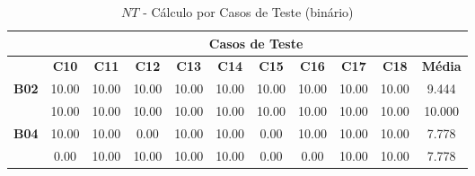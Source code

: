 \begin{table}[htbp]
	\centering
	\caption{$NT$ - Cálculo por Casos de Teste (binário)}
	\begin{tabular}{c|cccccccccc|}
		\cline{2-11}
		\rowcolor[HTML]{D0CECE} 
		\cellcolor[HTML]{F2F2F2}\textbf{} & \multicolumn{10}{c|}{\cellcolor[HTML]{D0CECE}\textbf{Casos de Teste}} \\ \hline
		\rowcolor[HTML]{D9D9D9} 
		\multicolumn{1}{|c|}{\cellcolor[HTML]{D0CECE}\textbf{Part.}} & \multicolumn{1}{c|}{\cellcolor[HTML]{D9D9D9}\textbf{C10}} & \multicolumn{1}{c|}{\cellcolor[HTML]{D9D9D9}\textbf{C11}} & \multicolumn{1}{c|}{\cellcolor[HTML]{D9D9D9}\textbf{C12}} & \multicolumn{1}{c|}{\cellcolor[HTML]{D9D9D9}\textbf{C13}} & \multicolumn{1}{c|}{\cellcolor[HTML]{D9D9D9}\textbf{C14}} & \multicolumn{1}{c|}{\cellcolor[HTML]{D9D9D9}\textbf{C15}} & \multicolumn{1}{c|}{\cellcolor[HTML]{D9D9D9}\textbf{C16}} & \multicolumn{1}{c|}{\cellcolor[HTML]{D9D9D9}\textbf{C17}} & \multicolumn{1}{c|}{\cellcolor[HTML]{D9D9D9}\textbf{C18}} & \textbf{Média} \\ \hline
		\multicolumn{1}{|c|}{\textbf{B02}} & \multicolumn{1}{c|}{10.00} & \multicolumn{1}{c|}{10.00} & \multicolumn{1}{c|}{10.00} & \multicolumn{1}{c|}{10.00} & \multicolumn{1}{c|}{10.00} & \multicolumn{1}{c|}{10.00} & \multicolumn{1}{c|}{10.00} & \multicolumn{1}{c|}{10.00} & \multicolumn{1}{c|}{10.00} & 9.444 \\ \hline
		\rowcolor[HTML]{F2F2F2} 
		\multicolumn{1}{|c|}{\cellcolor[HTML]{F2F2F2}\textbf{B03}} & \multicolumn{1}{c|}{\cellcolor[HTML]{F2F2F2}10.00} & \multicolumn{1}{c|}{\cellcolor[HTML]{F2F2F2}10.00} & \multicolumn{1}{c|}{\cellcolor[HTML]{F2F2F2}10.00} & \multicolumn{1}{c|}{\cellcolor[HTML]{F2F2F2}10.00} & \multicolumn{1}{c|}{\cellcolor[HTML]{F2F2F2}10.00} & \multicolumn{1}{c|}{\cellcolor[HTML]{F2F2F2}10.00} & \multicolumn{1}{c|}{\cellcolor[HTML]{F2F2F2}10.00} & \multicolumn{1}{c|}{\cellcolor[HTML]{F2F2F2}10.00} & \multicolumn{1}{c|}{\cellcolor[HTML]{F2F2F2}10.00} & 10.000 \\ \hline
		\multicolumn{1}{|c|}{\textbf{B04}} & \multicolumn{1}{c|}{10.00} & \multicolumn{1}{c|}{10.00} & \multicolumn{1}{c|}{0.00} & \multicolumn{1}{c|}{10.00} & \multicolumn{1}{c|}{10.00} & \multicolumn{1}{c|}{0.00} & \multicolumn{1}{c|}{10.00} & \multicolumn{1}{c|}{10.00} & \multicolumn{1}{c|}{10.00} & 7.778 \\ \hline
		\rowcolor[HTML]{F2F2F2} 
		\multicolumn{1}{|c|}{\cellcolor[HTML]{F2F2F2}\textbf{B05}} & \multicolumn{1}{c|}{\cellcolor[HTML]{F2F2F2}0.00} & \multicolumn{1}{c|}{\cellcolor[HTML]{F2F2F2}10.00} & \multicolumn{1}{c|}{\cellcolor[HTML]{F2F2F2}10.00} & \multicolumn{1}{c|}{\cellcolor[HTML]{F2F2F2}10.00} & \multicolumn{1}{c|}{\cellcolor[HTML]{F2F2F2}10.00} & \multicolumn{1}{c|}{\cellcolor[HTML]{F2F2F2}0.00} & \multicolumn{1}{c|}{\cellcolor[HTML]{F2F2F2}0.00} & \multicolumn{1}{c|}{\cellcolor[HTML]{F2F2F2}10.00} & \multicolumn{1}{c|}{\cellcolor[HTML]{F2F2F2}10.00} & 7.778 \\ \hline

\end{tabular}
\end{table}
